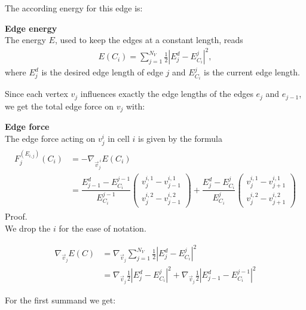 The according energy for this edge is:
\begin{definition} \textbf{Edge energy} \\
	The energy $E$, used to keep the edges at a constant length, reads 
	\begin{align}
		E(C_i) =  \sum\limits_{j=1}^{N_V} \frac{1}{2} | E_{j}^d - E^j_{C_i}|^2, \label{eq:edgeEnergy} 
	\end{align}
	where $E_{j}^d$ is the desired edge length of edge $j$ and $E^j_{C_i}$ is the current edge length. 
\end{definition}

Since each vertex $v_j$ influences exactly the edge lengths of the edges $e_{j}$ and $e_{j-1}$, we get the total edge force on $v_j$ with: 

\begin{proposition} \textbf{Edge force} \\

	The edge force acting on $v_j^i$ in cell $i$ is given by the formula
	\begin{align}
		\begin{split}
			F^{(E_{i,j})}_j(C_i) &= - \nabla_{\vec{v}^{\: i}_j} E(C_i) \\
				&= \dfrac{E^d_{j-1} - E^{j-1}_{C_i}}{E^{j-1}_{C_i}}  \begin{pmatrix} v_{j}^{i,1} - v_{j-1}^{i,1} \\[0.5em]  v_{j}^{i,2} - v_{j-1}^{i,2}  \end{pmatrix}
				+ \dfrac{E^d_{j} - E^j_{C_i}}{E^j_{C_i}}  \begin{pmatrix} v_{j}^{i,1} - v_{j+1}^{i,1} \\[0.5em]  v_{j}^{i,2} - v_{j+1}^{i,2} 
			\end{pmatrix}
		\end{split}
		\label{force:edge}
	\end{align}
	Proof. \\
	We drop the $i$ for the ease of notation. 

	\begin{align*}
		\nabla_{\vec{v}_{j}} E(C) &= \nabla_{\vec{v}_{j}} \sum\limits_{j=1}^{N_V} \frac{1}{2} | E_{j}^d - E^j_{C_i}|^2 \\
		&= \nabla_{\vec{v}_{j}} \frac{1}{2} | E_{j}^d - E^j_{C_i}|^2 + \nabla_{\vec{v}_{j}} \frac{1}{2} | E_{j-1}^d - E^{j-1}_{C_i}|^2
	\end{align*}

	For the first summand we get:


\end{proposition}
